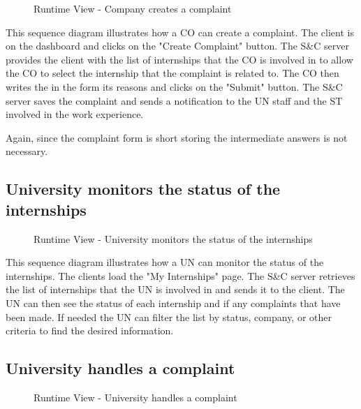 \begin{figure}[H]
      \centering
      \caption{Runtime View - Company creates a complaint}
      \label{fig:rv-co-creates-complaint}
\end{figure}

\par This sequence diagram illustrates how a CO can create a complaint. The client is on the dashboard and clicks 
on the "Create Complaint" button. The S\&C server provides the client with the list of internships that the CO is 
involved in to allow the CO to select the internship that the complaint is related to. The CO then writes the in the 
form its reasons and clicks on the "Submit" button. The S\&C server saves the complaint and sends a notification to 
the UN staff and the ST involved in the work experience.

\par Again, since the complaint form is short storing the intermediate answers is not necessary.

\subsection{University monitors the status of the internships}
\label{sub:university-monitors-the-status-of-the-internships}%

\begin{figure}[H]
      \centering
      \caption{Runtime View - University monitors the status of the internships}
      \label{fig:rv-un-monitors-internships}
\end{figure}

\par This sequence diagram illustrates how a UN can monitor the status of the internships. The clients load the "My 
Internships" page. The S\&C server retrieves the list of internships that the UN is involved in and sends it to the 
client. The UN can then see the status of each internship and if any complaints that have been made. If needed the UN 
can filter the list by status, company, or other criteria to find the desired information.

\subsection{University handles a complaint}
\label{sub:university-handles-a-complaint}%

\begin{figure}[H]
      \centering
      \caption{Runtime View - University handles a complaint}
      \label{fig:rv-un-handles-complaint}
\end{figure}

